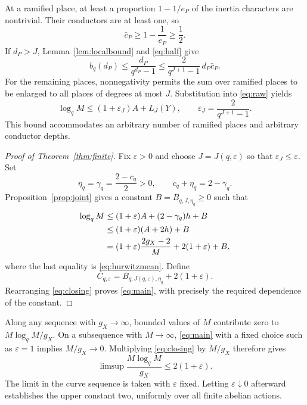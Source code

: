 \documentclass[12pt,onecolumn,draftclsnofoot,letterpaper]{IEEEtran}
\theoremstyle{remark}
\begin{document}
At a ramified place, at least a proportion $1-1/e_P$ of the inertia characters are nontrivial. Their conductors are at least one, so
\begin{equation}
 \bar c_P\ge1-\frac1{e_P}\ge\frac12.
 \label{eq:half}
\end{equation}
If $d_P>J$, Lemma~\ref{lem:localbound} and \eqref{eq:half} give
\[
 b_q(d_P)\le\frac{d_P}{q^{d_P}-1}
 \le\frac{2}{q^{J+1}-1}\,d_P\bar c_P.
\]
For the remaining places, nonnegativity permits the sum over ramified places to be enlarged to all places of degrees at most $J$. Substitution into \eqref{eq:raw} yields
\begin{equation}
 \log_qM\le(1+\varepsilon_J)A+L_J(Y),
 \qquad \varepsilon_J=\frac2{q^{J+1}-1}.
 \label{eq:keyglobal}
\end{equation}
This bound accommodates an arbitrary number of ramified places and arbitrary conductor depths.
\begin{proof}[Proof of Theorem~\ref{thm:finite}]
Fix $\varepsilon>0$ and choose $J=J(q,\varepsilon)$ so that $\varepsilon_J\le\varepsilon$. Set
\begin{equation}
 \eta_q=\gamma_q=\frac{2-c_q}{2}>0,
 \qquad c_q+\eta_q=2-\gamma_q.
 \label{eq:gamma}
\end{equation}
Proposition~\ref{prop:joint} gives a constant $B=B_{q,J,\eta_q}\ge0$ such that
\begin{align}
 \log_qM
 &\le(1+\varepsilon)A+(2-\gamma_q)h+B\notag\\
 &\le(1+\varepsilon)(A+2h)+B\notag\\
 &=(1+\varepsilon)\frac{2g_X-2}{M}+2(1+\varepsilon)+B,
 \label{eq:closing}
\end{align}
where the last equality is \eqref{eq:hurwitzmean}. Define
\begin{equation}
 C_{q,\varepsilon}
 =B_{q,J(q,\varepsilon),\eta_q}+2(1+\varepsilon).
 \label{eq:Cconstant}
\end{equation}
Rearranging \eqref{eq:closing} proves \eqref{eq:main}, with precisely the required dependence of the constant.
\end{proof}

Along any sequence with $g_X\to\infty$, bounded values of $M$ contribute zero to $M\log_qM/g_X$. On a subsequence with $M\to\infty$, \eqref{eq:main} with a fixed choice such as $\varepsilon=1$ implies $M/g_X\to0$. Multiplying \eqref{eq:closing} by $M/g_X$ therefore gives
\begin{equation}
 \limsup\frac{M\log_qM}{g_X}\le2(1+\varepsilon).
 \label{eq:epslimit}
\end{equation}
The limit in the curve sequence is taken with $\varepsilon$ fixed. Letting $\varepsilon\downarrow0$ afterward establishes the upper constant two, uniformly over all finite abelian actions.
\end{document}
